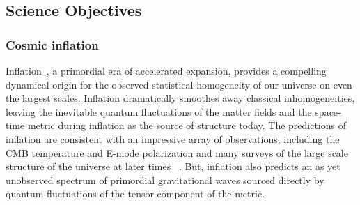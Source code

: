 
\subsection{Science Objectives}
\label{sec:science}

\vspace{-0.05in}

 
\subsubsection{Cosmic inflation}

\vspace{-0.05in}


Inflation~\cite{guth81,linde82,albrecht82,sato81,kolb94}, a primordial era of accelerated expansion, provides a compelling 
dynamical origin for the observed statistical homogeneity of our universe on even the largest scales. 
Inflation dramatically smoothes away classical inhomogeneities, leaving the inevitable quantum fluctuations 
of the matter fields and the space-time metric during inflation as the source of structure today.
The predictions of inflation are consistent with an impressive array of observations, including the 
\ac{CMB} temperature and E-mode polarization and many surveys of the large 
scale structure of the universe at later times ~\cite{spergel06,Tegmark:2006az,planck2015parameters,planck2015inflation}. 
But, inflation also predicts an as yet unobserved spectrum of primordial gravitational waves sourced directly by 
quantum fluctuations of the tensor component of the metric. 

